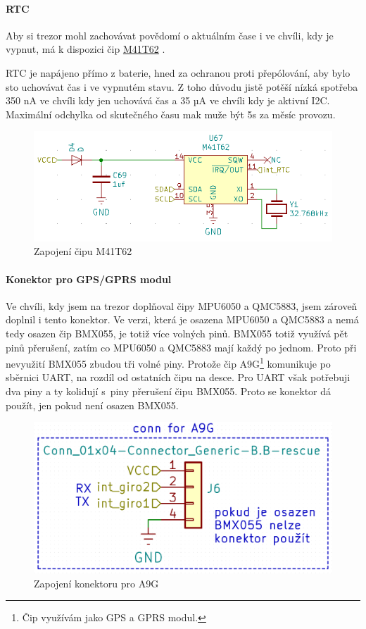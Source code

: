 \newpage

\paragraph{RTC}
Aby si trezor mohl zachovávat povědomí o aktuálním čase i ve chvíli, kdy je vypnut, má k dispozici čip 
\href{https://datasheet.lcsc.com/szlcsc/STMicroelectronics-M41T62Q6F_C113207.pdf}{M41T62} \parencite{m41t62}.

RTC je napájeno přímo z baterie, hned za ochranou proti přepólování, aby bylo sto uchovávat čas i ve vypnutém stavu.
Z toho důvodu jistě potěší nízká spotřeba 350 nA ve chvíli kdy jen uchovává čas a 35 µA ve chvíli kdy je aktivní I2C.
Maximální odchylka od skutečného času mak muže být 5s za měsíc provozu.

\begin{figure}[h]
    \centering
    \includegraphics[width=\textwidth]{kapitoly/obrazky/E4/vnimani/RTC.png}
    \caption{Zapojení čipu M41T62}
    \label{fig:E4-M41T62}
\end{figure}

\newpage

\paragraph{Konektor pro GPS/GPRS modul}
Ve chvíli, kdy jsem na trezor do\-pl\-ňo\-val čipy MPU6050 a QMC5883, jsem zároveň doplnil i tento konektor. Ve verzi, která je osazena MPU6050 a QMC5883 a nemá tedy osazen čip BMX055, 
je totiž více volných pinů. BMX055 totiž využívá pět pinů přerušení, zatím co MPU6050 a QMC5883 mají každý po jednom. Proto při nevyužití BMX055 zbudou tři volné piny.
Protože čip A9G\footnote{Čip využívám jako GPS a GPRS modul.} komunikuje po sběrnici UART, na rozdíl od ostatních čipu na desce. Pro UART však potřebuji
dva piny a ty kolidují s~piny přerušení čipu BMX055. Proto se konektor dá použít, jen pokud není osazen BMX055.

\begin{figure}[h]
    \centering
    \includegraphics[width=\textwidth]{kapitoly/obrazky/E4/vnimani/conn-A9G.png}
    \caption{Zapojení konektoru pro A9G}
    \label{fig:E4-A9G}
\end{figure}

